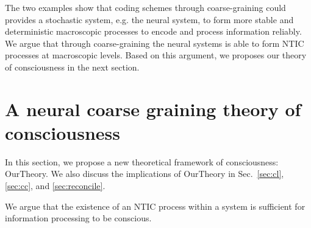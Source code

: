 \documentclass[utf8]{article}
\begin{document}
        The two examples show that coding schemes through coarse-graining could provides a stochastic system, e.g. the neural system, to form more stable and deterministic macroscopic processes to encode and process information reliably. We argue that through coarse-graining the neural systems is able to form NTIC processes at macroscopic levels. Based on this argument, we proposes our theory of consciousness in the next section. 


			
			








	\section{A neural coarse graining theory of consciousness}\label{sec:OurTheory}
	

        In this section, we propose a new theoretical framework of consciousness: \acf{OurTheory}. We also discuss the implications of \ac{OurTheory} in Sec.~\ref{sec:cl}, \ref{sec:cc}, and \ref{sec:reconcile}.
        
        We argue that the existence of an NTIC process within a system is sufficient for information processing to be conscious.
\end{document}
